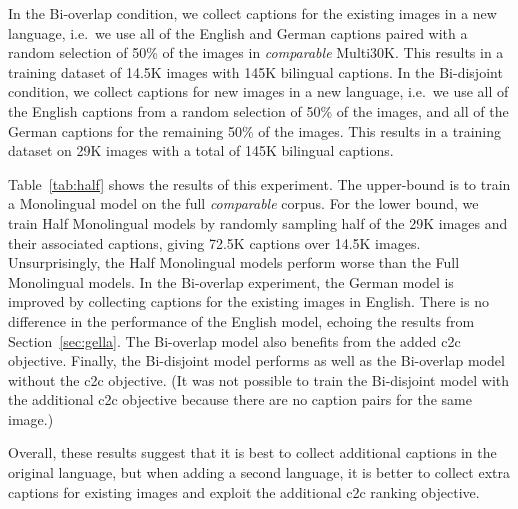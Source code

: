 In the Bi-overlap condition, we collect captions for the existing images in a new language, i.e.\ we use all of the English and German captions paired with a random selection of 50\% of the images in {\it comparable} Multi30K. This results in a training dataset of 14.5K images with 145K bilingual captions. In the Bi-disjoint condition, we collect captions for new images in a new language, i.e.\  we use all of the English captions from a random selection of 50\% of the images, and all of the German captions for the remaining 50\% of the images. This results in a training dataset on 29K images with a total of 145K bilingual captions.

Table~\ref{tab:half} shows the results of this experiment. The upper-bound is to train a Monolingual model on the full \textit{comparable} corpus. For the lower bound, we train Half Monolingual models by randomly sampling half of the 29K images and their associated captions, giving 72.5K captions over 14.5K images. Unsurprisingly, the Half Monolingual models perform worse than the Full Monolingual models. In the Bi-overlap experiment, the German model is improved by collecting captions for the existing images in English. There is no difference in the performance of the English model, echoing the results from Section~\ref{sec:gella}. The Bi-overlap model also benefits from the added c2c objective. Finally, the Bi-disjoint model performs as well as the Bi-overlap model without the c2c objective. (It was not possible to train the Bi-disjoint model with the additional c2c objective because there are no caption pairs for the same image.)

Overall, these results suggest that it is best to collect additional captions in the original language, but when adding a second language, it is better to collect extra captions for existing images and exploit the additional c2c ranking objective.



